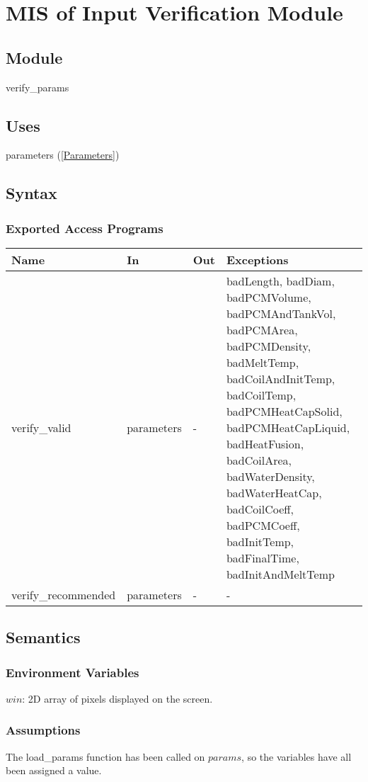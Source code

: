 \documentclass[12pt]{article}
\begin{document}
\section{MIS of Input Verification Module} \label{VerifyInput}
\subsection{Module}
verify\_params
\subsection{Uses}
parameters (\ref{Parameters})
\subsection{Syntax}
\subsubsection{Exported Access Programs}
\begin{center}
\begin{tabular}{p{4cm} p{2cm} p{2cm} p{6cm}}
\hline
\textbf{Name} & \textbf{In} & \textbf{Out} & \textbf{Exceptions} \\
\hline
verify\_valid & parameters & - & badLength, badDiam, badPCMVolume, badPCMAndTankVol, badPCMArea, badPCMDensity, badMeltTemp, badCoilAndInitTemp, badCoilTemp, badPCMHeatCapSolid, badPCMHeatCapLiquid, badHeatFusion, badCoilArea, badWaterDensity, badWaterHeatCap, badCoilCoeff, badPCMCoeff, badInitTemp, badFinalTime, badInitAndMeltTemp \\
\hline
verify\_recommended & parameters & - & - \\
\hline
\end{tabular}
\end{center}
\subsection{Semantics}
\subsubsection{Environment Variables}
$win$: 2D array of pixels displayed on the screen.
\subsubsection{Assumptions}
The load\_params function has been called on $params$, so the variables have all been assigned a value.
\end{document}
